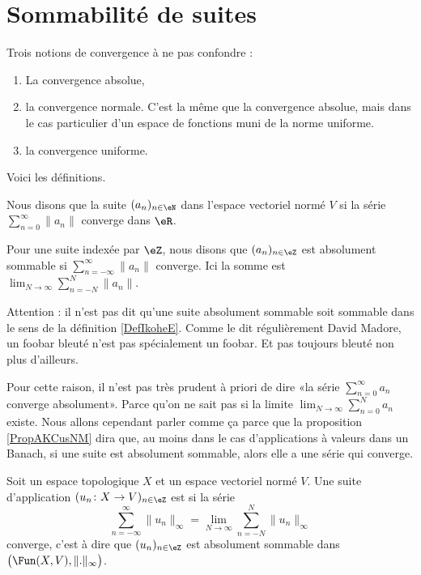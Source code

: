 \section{Sommabilité de suites}


Trois notions de convergence à ne pas confondre :
\begin{enumerate}
	\item
	      La convergence absolue,
	\item
	      la convergence normale. C'est la même que la convergence absolue, mais dans le cas particulier d'un espace de fonctions muni de la norme uniforme.
	\item
	      la convergence uniforme.
\end{enumerate}
Voici les définitions.

\begin{definition} \label{DefVFUIXwU}
	Nous disons que la suite \( (a_n)_{n\in \eN}\) dans l'espace vectoriel normé \( V\)  si la série \( \sum_{n=0}^{\infty}\| a_n \|\) converge dans \( \eR\).

	Pour une suite indexée par \( \eZ\), nous disons que \( (a_n)_{n\in \eZ}\) est absolument sommable si \( \sum_{n=-\infty}^{\infty}\| a_n \|\) converge. Ici la somme est \( \lim_{N\to \infty}\sum_{n=-N}^N\| a_n \|\).
\end{definition}

Attention : il n'est pas dit qu'une suite absolument sommable soit sommable dans le sens de la définition \ref{DefIkoheE}. Comme le dit régulièrement David Madore, un foobar bleuté n'est pas spécialement un foobar. Et pas toujours bleuté non plus d'ailleurs.

Pour cette raison, il n'est pas très prudent à priori de dire «la série \( \sum_{n=0}^{\infty}a_n\) converge absolument». Parce qu'on ne sait pas si la limite \( \lim_{N\to \infty}\sum_{n=0}^Na_n\) existe. Nous allons cependant parler comme ça parce que la proposition \ref{PropAKCusNM} dira que, au moins dans le cas d'applications à valeurs dans un Banach, si une suite est absolument sommable, alors elle a une série qui converge.

\begin{definition} \label{DefVBrJUxo}
	Soit un espace topologique \( X\) et un espace vectoriel normé \( V\). Une suite d'application \( (u_n \colon X\to V)_{n\in \eZ}  \) est  si la série
	\begin{equation}
		\sum_{n=-\infty}^{\infty}\| u_n \|_{\infty}=\lim_{N\to \infty}\sum_{n=-N}^N\| u_n \|_{\infty}
	\end{equation}
	converge, c'est à dire que \( (u_n)_{n\in \eZ}\) est absolument sommable dans \( \big( \Fun(X,V), \| . \|_{\infty} \big)\).
\end{definition}

